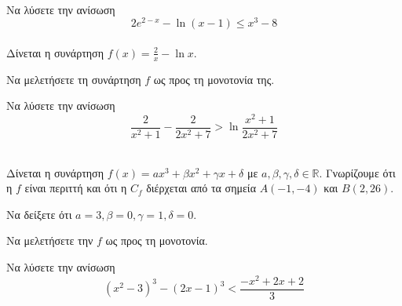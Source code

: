 \documentclass[twoside,nofonts,ektypwsh]{frontisthrio-diag}
\begin{document}
\begin{thema}
\item\mbox{}\\\vspace{-7mm}
\begin{erwthma}
\item Να λύσετε την ανίσωση
\[ 2e^{2-x}-\ln{(x-1)\leq x^3-8} \]\\
Δίνεται η συνάρτηση $ f(x)=\frac{2}{x}-\ln{x} $.
\item Να μελετήσετε τη συνάρτηση $ f $ ως προς τη μονοτονία της.
\item Να λύσετε την ανίσωση
\[ \frac{2}{x^2+1}-\frac{2}{2x^2+7}>\ln{\frac{x^2+1}{2x^2+7}} \]
\end{erwthma}
\item \mbox{}\\Δίνεται η συνάρτηση $ f(x)=ax^3+\beta x^2+\gamma x+\delta $ με $ a,\beta,\gamma,\delta\in\mathbb{R} $. Γνωρίζουμε ότι η $ f $ είναι περιττή και ότι η $ C_f $ διέρχεται από τα σημεία $ A(-1,-4) $ και $ B(2,26) $.
\begin{erwthma}
\item Να δείξετε ότι $ a=3,\beta=0,\gamma=1,\delta=0 $.
\item Να μελετήσετε την $ f $ ως προς τη μονοτονία.
\item Να λύσετε την ανίσωση
\[ (x^2-3)^3-(2x-1)^3<\frac{-x^2+2x+2}{3} \]
\end{erwthma}
\end{thema}
\kaliepityxia
\end{document}
